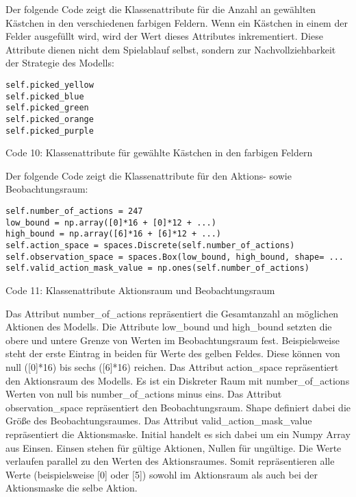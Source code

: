 \begin{minipage}{\linewidth}
Der folgende Code zeigt die Klassenattribute für die Anzahl an gewählten Kästchen in den verschiedenen farbigen Feldern. Wenn ein Kästchen in einem der Felder ausgefüllt wird, wird der Wert dieses Attributes inkrementiert. Diese Attribute dienen nicht dem Spielablauf selbst, sondern zur Nachvollziehbarkeit der Strategie des Modells:
\vspace{0.5cm}
\begin{lstlisting}
self.picked_yellow
self.picked_blue
self.picked_green
self.picked_orange
self.picked_purple
\end{lstlisting}
Code 10: Klassenattribute für gewählte Kästchen in den farbigen Feldern\\
\end{minipage}

\begin{minipage}{\linewidth}
Der folgende Code zeigt die Klassenattribute für den Aktions- sowie Beobachtungsraum:
\vspace{0.5cm}
\begin{lstlisting}
self.number_of_actions = 247
low_bound = np.array([0]*16 + [0]*12 + ...)
high_bound = np.array([6]*16 + [6]*12 + ...)
self.action_space = spaces.Discrete(self.number_of_actions)
self.observation_space = spaces.Box(low_bound, high_bound, shape= ...
self.valid_action_mask_value = np.ones(self.number_of_actions)
\end{lstlisting}
Code 11: Klassenattribute Aktionsraum und Beobachtungsraum\\
\end{minipage}

Das Attribut number\_of\_actions repräsentiert die Gesamtanzahl an möglichen Aktionen des Modells. Die Attribute low\_bound und high\_bound setzten die obere und untere Grenze von Werten im Beobachtungsraum fest. Beispielsweise steht der erste Eintrag in beiden für Werte des gelben Feldes. Diese können von null ([0]*16) bis sechs ([6]*16) reichen. Das Attribut action\_space repräsentiert den Aktionsraum des Modells. Es ist ein Diskreter Raum mit number\_of\_actions Werten von null bis number\_of\_actions minus eins. Das Attribut observation\_space repräsentiert den Beobachtungsraum. Shape definiert dabei die Größe des Beobachtungsraumes. Das Attribut valid\_action\_mask\_value repräsentiert die Aktionsmaske. Initial handelt es sich dabei um ein Numpy Array aus Einsen. Einsen stehen für gültige Aktionen, Nullen für ungültige. Die Werte verlaufen parallel zu den Werten des Aktionsraumes. Somit repräsentieren alle Werte (beispielsweise [0] oder [5]) sowohl im Aktionsraum als auch bei der Aktionsmaske die selbe Aktion.\\

